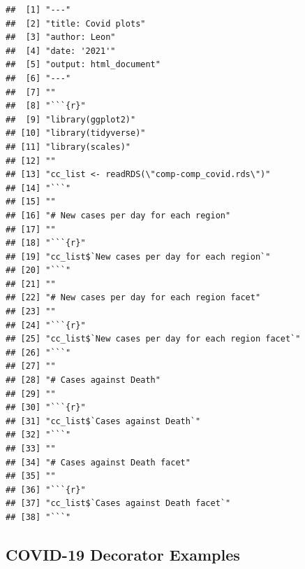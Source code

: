 \documentclass[
]{article}
\begin{document}
\begin{verbatim}
##  [1] "---"                                              
##  [2] "title: Covid plots"                               
##  [3] "author: Leon"                                     
##  [4] "date: '2021'"                                     
##  [5] "output: html_document"                            
##  [6] "---"                                              
##  [7] ""                                                 
##  [8] "```{r}"                                           
##  [9] "library(ggplot2)"                                 
## [10] "library(tidyverse)"                               
## [11] "library(scales)"                                  
## [12] ""                                                 
## [13] "cc_list <- readRDS(\"comp-comp_covid.rds\")"      
## [14] "```"                                              
## [15] ""                                                 
## [16] "# New cases per day for each region"              
## [17] ""                                                 
## [18] "```{r}"                                           
## [19] "cc_list$`New cases per day for each region`"      
## [20] "```"                                              
## [21] ""                                                 
## [22] "# New cases per day for each region facet"        
## [23] ""                                                 
## [24] "```{r}"                                           
## [25] "cc_list$`New cases per day for each region facet`"
## [26] "```"                                              
## [27] ""                                                 
## [28] "# Cases against Death"                            
## [29] ""                                                 
## [30] "```{r}"                                           
## [31] "cc_list$`Cases against Death`"                    
## [32] "```"                                              
## [33] ""                                                 
## [34] "# Cases against Death facet"                      
## [35] ""                                                 
## [36] "```{r}"                                           
## [37] "cc_list$`Cases against Death facet`"              
## [38] "```"
\end{verbatim}

\hypertarget{covid-19-decorator-examples}{%
\subsection{COVID-19 Decorator
Examples}\label{covid-19-decorator-examples}}
\end{document}
